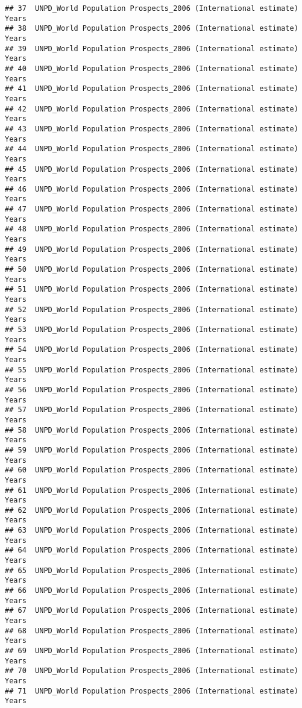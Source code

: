 \documentclass[]{article}
\begin{document}
\begin{verbatim}
## 37  UNPD_World Population Prospects_2006 (International estimate) Years
## 38  UNPD_World Population Prospects_2006 (International estimate) Years
## 39  UNPD_World Population Prospects_2006 (International estimate) Years
## 40  UNPD_World Population Prospects_2006 (International estimate) Years
## 41  UNPD_World Population Prospects_2006 (International estimate) Years
## 42  UNPD_World Population Prospects_2006 (International estimate) Years
## 43  UNPD_World Population Prospects_2006 (International estimate) Years
## 44  UNPD_World Population Prospects_2006 (International estimate) Years
## 45  UNPD_World Population Prospects_2006 (International estimate) Years
## 46  UNPD_World Population Prospects_2006 (International estimate) Years
## 47  UNPD_World Population Prospects_2006 (International estimate) Years
## 48  UNPD_World Population Prospects_2006 (International estimate) Years
## 49  UNPD_World Population Prospects_2006 (International estimate) Years
## 50  UNPD_World Population Prospects_2006 (International estimate) Years
## 51  UNPD_World Population Prospects_2006 (International estimate) Years
## 52  UNPD_World Population Prospects_2006 (International estimate) Years
## 53  UNPD_World Population Prospects_2006 (International estimate) Years
## 54  UNPD_World Population Prospects_2006 (International estimate) Years
## 55  UNPD_World Population Prospects_2006 (International estimate) Years
## 56  UNPD_World Population Prospects_2006 (International estimate) Years
## 57  UNPD_World Population Prospects_2006 (International estimate) Years
## 58  UNPD_World Population Prospects_2006 (International estimate) Years
## 59  UNPD_World Population Prospects_2006 (International estimate) Years
## 60  UNPD_World Population Prospects_2006 (International estimate) Years
## 61  UNPD_World Population Prospects_2006 (International estimate) Years
## 62  UNPD_World Population Prospects_2006 (International estimate) Years
## 63  UNPD_World Population Prospects_2006 (International estimate) Years
## 64  UNPD_World Population Prospects_2006 (International estimate) Years
## 65  UNPD_World Population Prospects_2006 (International estimate) Years
## 66  UNPD_World Population Prospects_2006 (International estimate) Years
## 67  UNPD_World Population Prospects_2006 (International estimate) Years
## 68  UNPD_World Population Prospects_2006 (International estimate) Years
## 69  UNPD_World Population Prospects_2006 (International estimate) Years
## 70  UNPD_World Population Prospects_2006 (International estimate) Years
## 71  UNPD_World Population Prospects_2006 (International estimate) Years

\end{verbatim}
\end{document}
